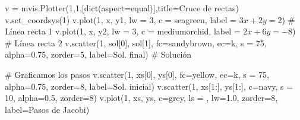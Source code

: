 \documentclass[
  letterpaper,
  DIV=11,
  numbers=noendperiod]{scrreprt}
\newenvironment{Shaded}{\begin{snugshade}}{\end{snugshade}}
\newcommand{\BuiltInTok}[1]{\textcolor[rgb]{0.00,0.23,0.31}{#1}}
\newcommand{\CommentTok}[1]{\textcolor[rgb]{0.37,0.37,0.37}{#1}}
\newcommand{\DecValTok}[1]{\textcolor[rgb]{0.68,0.00,0.00}{#1}}
\newcommand{\FloatTok}[1]{\textcolor[rgb]{0.68,0.00,0.00}{#1}}
\newcommand{\NormalTok}[1]{\textcolor[rgb]{0.00,0.23,0.31}{#1}}
\newcommand{\OperatorTok}[1]{\textcolor[rgb]{0.37,0.37,0.37}{#1}}
\newcommand{\StringTok}[1]{\textcolor[rgb]{0.13,0.47,0.30}{#1}}
\begin{document}
\begin{Shaded}
\begin{Highlighting}[]
\NormalTok{v }\OperatorTok{=}\NormalTok{ mvis.Plotter(}\DecValTok{1}\NormalTok{,}\DecValTok{1}\NormalTok{,[}\BuiltInTok{dict}\NormalTok{(aspect}\OperatorTok{=}\StringTok{\textquotesingle{}equal\textquotesingle{}}\NormalTok{)],title}\OperatorTok{=}\StringTok{\textquotesingle{}Cruce de rectas\textquotesingle{}}\NormalTok{) }
\NormalTok{v.set\_coordsys(}\DecValTok{1}\NormalTok{)}
\NormalTok{v.plot(}\DecValTok{1}\NormalTok{, x, y1, lw }\OperatorTok{=} \DecValTok{3}\NormalTok{, c }\OperatorTok{=} \StringTok{\textquotesingle{}seagreen\textquotesingle{}}\NormalTok{, label }\OperatorTok{=} \StringTok{\textquotesingle{}$3x+2y=2$\textquotesingle{}}\NormalTok{) }\CommentTok{\# Línea recta 1}
\NormalTok{v.plot(}\DecValTok{1}\NormalTok{, x, y2, lw }\OperatorTok{=} \DecValTok{3}\NormalTok{, c }\OperatorTok{=} \StringTok{\textquotesingle{}mediumorchid\textquotesingle{}}\NormalTok{, label }\OperatorTok{=} \StringTok{\textquotesingle{}$2x+6y={-}8$\textquotesingle{}}\NormalTok{) }\CommentTok{\# Línea recta 2}
\NormalTok{v.scatter(}\DecValTok{1}\NormalTok{, sol[}\DecValTok{0}\NormalTok{], sol[}\DecValTok{1}\NormalTok{], fc}\OperatorTok{=}\StringTok{\textquotesingle{}sandybrown\textquotesingle{}}\NormalTok{, ec}\OperatorTok{=}\StringTok{\textquotesingle{}k\textquotesingle{}}\NormalTok{, s }\OperatorTok{=} \DecValTok{75}\NormalTok{, alpha}\OperatorTok{=}\FloatTok{0.75}\NormalTok{, zorder}\OperatorTok{=}\DecValTok{5}\NormalTok{, label}\OperatorTok{=}\StringTok{\textquotesingle{}Sol. final\textquotesingle{}}\NormalTok{) }\CommentTok{\# Solución}

\CommentTok{\# Graficamos los pasos}
\NormalTok{v.scatter(}\DecValTok{1}\NormalTok{, xs[}\DecValTok{0}\NormalTok{], ys[}\DecValTok{0}\NormalTok{], fc}\OperatorTok{=}\StringTok{\textquotesingle{}yellow\textquotesingle{}}\NormalTok{, ec}\OperatorTok{=}\StringTok{\textquotesingle{}k\textquotesingle{}}\NormalTok{, s }\OperatorTok{=} \DecValTok{75}\NormalTok{, alpha}\OperatorTok{=}\FloatTok{0.75}\NormalTok{, zorder}\OperatorTok{=}\DecValTok{8}\NormalTok{, label}\OperatorTok{=}\StringTok{\textquotesingle{}Sol. inicial\textquotesingle{}}\NormalTok{)}
\NormalTok{v.scatter(}\DecValTok{1}\NormalTok{, xs[}\DecValTok{1}\NormalTok{:], ys[}\DecValTok{1}\NormalTok{:], c}\OperatorTok{=}\StringTok{\textquotesingle{}navy\textquotesingle{}}\NormalTok{, s }\OperatorTok{=} \DecValTok{10}\NormalTok{, alpha}\OperatorTok{=}\FloatTok{0.5}\NormalTok{, zorder}\OperatorTok{=}\DecValTok{8}\NormalTok{)}
\NormalTok{v.plot(}\DecValTok{1}\NormalTok{, xs, ys, c}\OperatorTok{=}\StringTok{\textquotesingle{}grey\textquotesingle{}}\NormalTok{, ls }\OperatorTok{=} \StringTok{\textquotesingle{}{-}{-}\textquotesingle{}}\NormalTok{, lw}\OperatorTok{=}\FloatTok{1.0}\NormalTok{, zorder}\OperatorTok{=}\DecValTok{8}\NormalTok{, label}\OperatorTok{=}\StringTok{\textquotesingle{}Pasos de Jacobi\textquotesingle{}}\NormalTok{)}


\end{Highlighting}
\end{Shaded}
\end{document}
